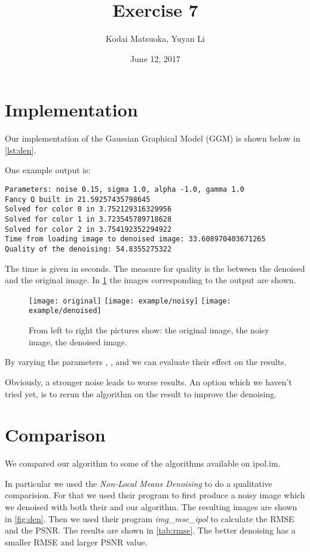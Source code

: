 \documentclass[12pt]{scrartcl}
\author{Kodai Matsuoka, Yuyan Li}
\title{Exercise 7}
\date{June 12, 2017}
\begin{document}
\maketitle

\section{Implementation}

Our implementation of the Gaussian Graphical Model (GGM) is shown below in \cref{lst:den}.

One example output is:

\begin{verbatim}
Parameters: noise 0.15, sigma 1.0, alpha -1.0, gamma 1.0
Fancy Q built in 21.59257435798645
Solved for color 0 in 3.752129316329956
Solved for color 1 in 3.723545789718628
Solved for color 2 in 3.754192352294922
Time from loading image to denoised image: 33.608970403671265
Quality of the denoising: 54.8355275322
\end{verbatim}

The time is given in seconds. The measure for quality is the  between the denoised and the original image.
In \cref{fig:ex} the images corresponding to the output are shown.

\begin{figure}[h]
  \centering
  \texttt{[image: original]}
  \texttt{[image: example/noisy]}
  \texttt{[image: example/denoised]}
  \caption{From left to right the pictures show: the original image, the noisy image, the denoised image.}
  \label{fig:ex}
\end{figure}

By varying the parameters , ,  and  we can evaluate their effect on the results.

Obviously, a stronger noise leads to worse results. An option which we haven't tried yet, is to rerun the algorithm on the result to improve the denoising.


\clearpage
\section{Comparison}

We compared our algorithm to some of the algorithms available on ipol.im.

In particular we used the \emph{Non-Local Means Denoising} to do a qualitative comparision. For that we used their program to first produce a noisy image which we denoised with both their and our algorithm. The resulting images are shown in \cref{fig:den}. Then we used their program \emph{img\_mse\_ipol} to calculate the RMSE and the PSNR. The results are shown in \cref{tab:rmse}. The better denoising has a smaller RMSE and larger PSNR value.
\end{document}
